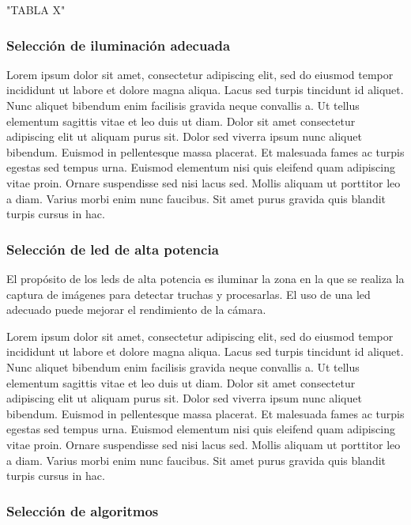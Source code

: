 "TABLA X"

\subsubsection{Selección de iluminación adecuada} 

Lorem ipsum dolor sit amet, consectetur adipiscing elit, sed do eiusmod tempor incididunt ut labore et dolore magna aliqua. Lacus sed turpis tincidunt id aliquet. Nunc aliquet bibendum enim facilisis gravida neque convallis a. Ut tellus elementum sagittis vitae et leo duis ut diam. Dolor sit amet consectetur adipiscing elit ut aliquam purus sit. Dolor sed viverra ipsum nunc aliquet bibendum. Euismod in pellentesque massa placerat. Et malesuada fames ac turpis egestas sed tempus urna. Euismod elementum nisi quis eleifend quam adipiscing vitae proin. Ornare suspendisse sed nisi lacus sed. Mollis aliquam ut porttitor leo a diam. Varius morbi enim nunc faucibus. Sit amet purus gravida quis blandit turpis cursus in hac.

\subsubsection{Selección de led de alta potencia} %

El propósito de los leds de alta potencia es iluminar la zona en la que se realiza la captura de imágenes para detectar truchas y procesarlas. El uso de una led adecuado puede mejorar el rendimiento de la cámara.

Lorem ipsum dolor sit amet, consectetur adipiscing elit, sed do eiusmod tempor incididunt ut labore et dolore magna aliqua. Lacus sed turpis tincidunt id aliquet. Nunc aliquet bibendum enim facilisis gravida neque convallis a. Ut tellus elementum sagittis vitae et leo duis ut diam. Dolor sit amet consectetur adipiscing elit ut aliquam purus sit. Dolor sed viverra ipsum nunc aliquet bibendum. Euismod in pellentesque massa placerat. Et malesuada fames ac turpis egestas sed tempus urna. Euismod elementum nisi quis eleifend quam adipiscing vitae proin. Ornare suspendisse sed nisi lacus sed. Mollis aliquam ut porttitor leo a diam. Varius morbi enim nunc faucibus. Sit amet purus gravida quis blandit turpis cursus in hac.

\subsubsection{Selección de algoritmos}
\label{sssec:seleccion de algoritmos}

